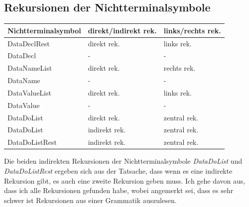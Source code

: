 \documentclass[11pt, a4paper, twoside]{article}   	%
\begin{document}
\subsection{Rekursionen der Nichtterminalsymbole}
    \begin{tabularx}{\textwidth}{|>{\centering}X|>{\centering}X|>{\centering\arraybackslash}X|}
    \hline
    \textbf{Nichtterminalsymbol} & \textbf{direkt/indirekt rek.} & \textbf{links/rechts rek.} \\ \hline
    DataDeclRest                 &           direkt rek.         &           links rek.\\ \hline
    DataDecl                     &               -               &             -           
    \\ \hline
    DataNameList                 &           direkt rek.         &           rechts rek. \\ \hline
    DataName                     &               -               &             -    
    \\ \hline
    DataValueList                &           direkt rek.         &           links rek. \\ \hline
    DataValue                    &               -               &             -    
    \\ \hline
    DataDoList                   &           direkt rek.         &           zentral rek.\\ \hline
    DataDoList                   &           indirekt rek.       &           zentral rek.\\ \hline
    DataDoListRest               &           indirekt rek.       &           zentral rek.\\ \hline
    \end{tabularx}
\newline
\newline
Die beiden indirekten Rekursionen der Nichtterminalsymbole \emph{DataDoList} und \emph{DataDoListRest} ergeben sich aus der Tatsache, dass wenn es eine indirekte Rekursion gibt, es auch eine zweite Rekursion geben muss. Ich gehe davon aus, dass ich alle Rekursionen gefunden habe, wobei angemerkt sei, dass es sehr schwer ist Rekursionen aus einer Grammatik auszulesen. 
\end{document}
